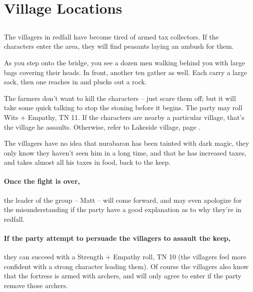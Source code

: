 \section{Village Locations}

\subsection{}

\begin{multicols}{2}


\noindent The villagers in \gls{redfall} have become tired of armed tax collectors.  If the characters enter the area, they will find peasants laying an ambush for them.

\begin{boxtext}

  As you step onto the bridge, you see a dozen men walking behind you with large bags covering their heads.  In front, another ten gather as well.  Each carry a large sack, then one reaches in and plucks out a rock.

\end{boxtext}

The farmers don't want to kill the characters -- just scare them off; but it will take some quick talking to stop the stoning before it begins.  The party may roll Wits + Empathy, TN 11.
If the characters are nearby a particular village, that's the village he assaults.
Otherwise, refer to Lakeside village, page \pageref{lakeside}.

The villagers have no idea that \gls{nurabaron} has been tainted with dark magic, they only know they haven't seen him in a long time, and that he has increased taxes, and takes almost all his taxes in food, back to the keep.


\paragraph{Once the fight is over,}
the leader of the group -- Matt -- will come forward, and may even apologize for the misunderstanding if the party have a good explanation as to why they're in \gls{redfall}.

\paragraph{If the party attempt to persuade the villagers to assault the keep,}
they can succeed with a Strength + Empathy roll, TN 10
(the villagers feel more confident with a strong character leading them).
Of course the villagers also know that the fortress is armed with archers, and will only agree to enter if the party remove those archers.


\end{multicols}
